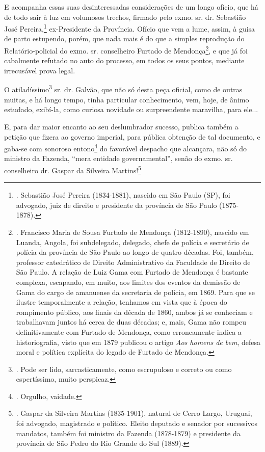 E acompanha essas suas desinteressadas considerações de um longo ofício,
que há de todo sair à luz em volumosos trechos, firmado pelo exmo. sr.
dr. Sebastião José Pereira,\footnote{. Sebastião José Pereira
  (1834-1881), nascido em São Paulo (SP), foi advogado, juiz de direito
  e presidente da província de São Paulo (1875-1878).} ex-Presidente da
Província. Ofício que vem a lume, assim, à guisa de parto estupendo,
porém, que nada mais é do que a simples reprodução do Relatório-policial
do exmo. sr. conselheiro Furtado de Mendonça\footnote{. Francisco Maria
  de Sousa Furtado de Mendonça (1812-1890), nascido em Luanda, Angola,
  foi subdelegado, delegado, chefe de polícia e secretário de polícia da
  província de São Paulo ao longo de quatro décadas. Foi, também,
  professor catedrático de Direito Administrativo da Faculdade de
  Direito de São Paulo. A relação de Luiz Gama com Furtado de Mendonça é
  bastante complexa, escapando, em muito, aos limites dos eventos da
  demissão de Gama do cargo de amanuense da secretaria de polícia, em
  1869. Para que se ilustre temporalmente a relação, tenhamos em vista
  que à época do rompimento público, aos finais da década de 1860, ambos
  já se conheciam e trabalhavam juntos há cerca de duas décadas; e,
  mais, Gama não rompeu definitivamente com Furtado de Mendonça, como
  erroneamente indica a historiografia, visto que em 1879 publicou o
  artigo \emph{Aos homens de bem}, defesa moral e política explícita do
  legado de Furtado de Mendonça.}, e que já foi cabalmente refutado no
auto do processo, em todos os seus pontos, mediante irrecusável prova
legal.

O atiladíssimo\footnote{. Pode ser lido, sarcasticamente, como
  escrupuloso e correto ou como espertíssimo, muito perspicaz.} sr. dr.
Galvão, que não só desta peça oficial, como de outras muitas, e há longo
tempo, tinha particular conhecimento, vem, hoje, de ânimo estudado,
exibí-la, como curiosa novidade ou surpreendente maravilha, para ele...

E, para dar maior encanto ao seu deslumbrador sucesso, publica também a
petição que fizera ao governo imperial, para pública obtenção de tal
documento, e gaba-se com sonoroso entono\footnote{. Orgulho, vaidade.}
do favorável despacho que alcançara, não só do ministro da Fazenda,
``mera entidade governamental'', senão do exmo. sr. conselheiro dr.
Gaspar da Silveira Martins!\footnote{. Gaspar da Silveira Martins
  (1835-1901), natural de Cerro Largo, Uruguai, foi advogado, magistrado
  e político. Eleito deputado e senador por sucessivos mandatos, também
  foi ministro da Fazenda (1878-1879) e presidente da província de São
  Pedro do Rio Grande do Sul (1889).}

